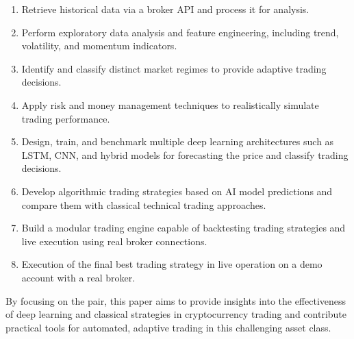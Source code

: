 \begin{enumerate}
    \item Retrieve historical \ethusdc data via a broker API and process it for analysis.
    \item Perform exploratory data analysis and feature engineering, including trend, volatility, and momentum indicators.
    \item Identify and classify distinct market regimes to provide adaptive trading decisions.
    \item Apply risk and money management techniques to realistically simulate trading performance.
    \item Design, train, and benchmark multiple deep learning architectures such as LSTM, CNN, and hybrid models for forecasting the price and classify trading decisions.
    \item Develop algorithmic trading strategies based on AI model predictions and compare them with classical technical trading approaches.
    \item Build a modular trading engine capable of backtesting trading strategies and live execution using real broker connections.
    \item Execution of the final best trading strategy in live operation on a demo account with a real broker.
\end{enumerate}

\noindent
By focusing on the \ethusdc pair, this paper aims to provide insights into the effectiveness of deep learning and classical strategies in cryptocurrency trading and contribute practical tools for automated, adaptive trading in this challenging asset class.
